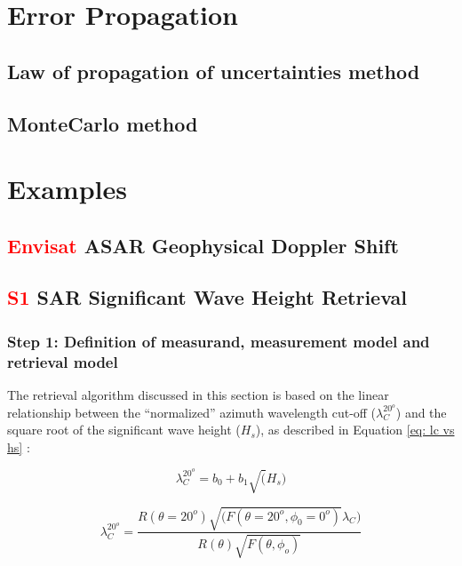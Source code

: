 \section{Error Propagation} \label{sec:error_propagation}

\subsection{Law of propagation of uncertainties method}
\subsection{MonteCarlo method}

\section{Examples}

\subsection{\textcolor{red}{Envisat} \ac{ASAR} Geophysical Doppler Shift}

\subsection{\textcolor{red}{S1} \ac{SAR} Significant Wave Height Retrieval}
\label{sec: SWH}

\subsubsection{Step 1: Definition of measurand, measurement model and retrieval model}
\label{sec: SWH model}

The retrieval algorithm discussed in this section is based on the linear
relationship between the ``normalized'' azimuth wavelength cut-off ($\lambda_{C}^{20^{o}}$) and the
square root of the significant wave height ($H_{s}$), as described in Equation
\ref{eq: lc vs hs} \cite{GriecoIJRS2016}:

\begin{equation}
	\lambda_{C}^{20^{o}} = b_{0}+b_{1}\sqrt(H_{s})
	\label{eq: lc vs hs}
\end{equation}

\begin{equation}
   \lambda_{C}^{20^{o}} = \frac{R(\theta=20^{o})\sqrt{(F(\theta=20^{o},\phi_{0}=0^{o})}\lambda_{C})}{R(\theta)\sqrt{F(\theta,\phi_{o})}}
    \label{eq: lc20}
\end{equation}

